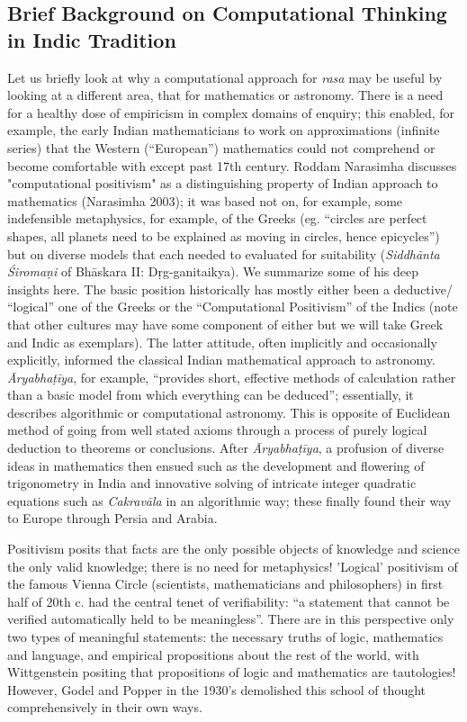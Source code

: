 \subsection*{Brief Background on Computational Thinking in Indic Tradition}

Let us briefly look at why a computational approach for \textsl{rasa} may be useful by looking at a different area, that for mathematics or astronomy. There is a need for a healthy dose of empiricism in complex domains of enquiry; this enabled, for example, the early Indian mathematicians to work on approximations (infinite series) that the Western (“European”) mathematics could not comprehend or become comfortable with except past 17th century. Roddam Narasimha discusses "computational positivism" as a distinguishing property of Indian approach to mathematics (Narasimha 2003); it was based not on, for example, some indefensible metaphysics, for example, of the Greeks (eg. “circles are perfect shapes, all planets need to be explained as moving in circles, hence epicycles”) but on diverse models that each needed to evaluated for suitability (\textsl{Siddhānta Śiromaṇi} of Bhāskara II: Dṛg-ganitaikya). We summarize some of his deep insights here. The basic position historically has mostly either been a deductive/ “logical” one of the Greeks or the “Computational Positivism” of the Indics (note that other cultures may have some component of either but we will take Greek and Indic as exemplars). The latter attitude, often implicitly and occasionally explicitly, informed the classical Indian mathematical approach to astronomy. \textsl{Āryabhaṭīya}, for example, “provides short, effective methods of calculation rather than a basic model from which everything can be deduced”; essentially, it describes algorithmic or computational astronomy. This is opposite of Euclidean method of going from well stated axioms through a process of purely logical deduction to theorems or conclusions. After \textsl{Āryabhaṭīya}, a profusion of diverse ideas in mathematics then ensued such as the development and flowering of trigonometry in India and innovative solving of intricate integer quadratic equations such as \textsl{Cakravāla} in an algorithmic way; these finally found their way to Europe through Persia and Arabia.

Positivism posits that facts are the only possible objects of knowledge and science the only valid knowledge; there is no need for metaphysics! 'Logical' positivism of the famous Vienna Circle (scientists, mathematicians and philosophers) in first half of 20th c. had the central tenet of verifiability: “a statement that cannot be verified automatically held to be meaningless”. There are in this perspective only two types of meaningful statements: the necessary truths of logic, mathematics and language, and empirical propositions about the rest of the world, with Wittgenstein positing that propositions of logic and mathematics are tautologies! However, Godel and Popper in the 1930’s demolished this school of thought comprehensively in their own ways. 

